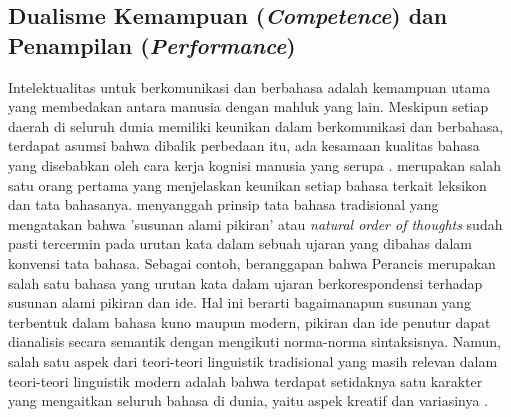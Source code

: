 \subsection{Dualisme Kemampuan (\textit{Competence}) dan Penampilan (\textit{Performance})}
Intelektualitas untuk berkomunikasi dan berbahasa adalah kemampuan utama yang membedakan antara manusia dengan mahluk yang lain. Meskipun setiap daerah di seluruh dunia memiliki keunikan dalam berkomunikasi dan berbahasa, terdapat asumsi bahwa dibalik perbedaan itu, ada  kesamaan kualitas bahasa yang disebabkan oleh cara kerja kognisi manusia yang serupa \citep{sapir1921intro, chomsky1965syntactic}. \cite{beattie1788theory} merupakan salah satu orang pertama yang menjelaskan keunikan setiap bahasa terkait leksikon dan tata bahasanya. \cite{chomsky1965syntactic} menyanggah prinsip tata bahasa tradisional yang mengatakan bahwa 'susunan alami pikiran' atau \textit{natural order of thoughts} sudah pasti tercermin pada urutan kata dalam sebuah ujaran yang dibahas dalam konvensi tata bahasa. Sebagai contoh, \cite{diderot1751lettre} beranggapan bahwa Perancis merupakan salah satu bahasa yang urutan kata dalam ujaran berkorespondensi terhadap susunan alami pikiran dan ide. Hal ini berarti bagaimanapun susunan yang terbentuk dalam bahasa kuno maupun modern, pikiran dan ide penutur dapat dianalisis secara semantik dengan mengikuti norma-norma sintaksisnya. Namun, salah satu aspek dari teori-teori linguistik tradisional yang masih relevan dalam teori-teori linguistik modern adalah bahwa terdapat setidaknya satu karakter yang mengaitkan seluruh bahasa di dunia, yaitu aspek kreatif dan variasinya \citep{hawkins2014cross}.

